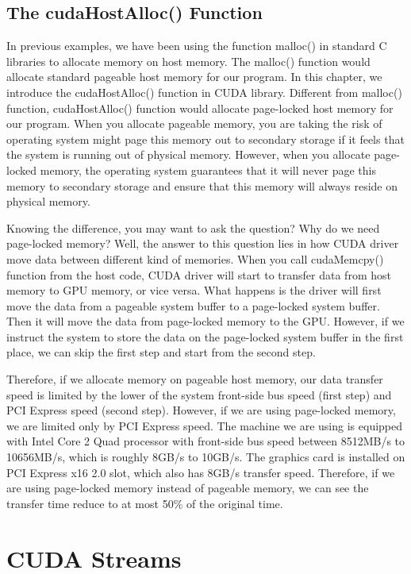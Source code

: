 \documentclass[letterpaper,10pt,openany,oneside]{sphinxmanual}
\begin{document}
\subsection{The cudaHostAlloc() Function}
\label{Streams/Streams:the-cudahostalloc-function}
In previous examples, we have been using the function malloc() in standard C libraries to allocate memory on host memory. The malloc() function would allocate standard pageable host memory for our program. In this chapter, we introduce the cudaHostAlloc() function in CUDA library. Different from malloc() function, cudaHostAlloc() function would allocate page-locked host memory for our program. When you allocate pageable memory, you are taking the risk of operating system might page this memory out to secondary storage if it feels that the system is running out of physical memory. However, when you allocate page-locked memory, the operating system guarantees that it will never page this memory to secondary storage and ensure that this memory will always reside on physical memory.

Knowing the difference, you may want to ask the question? Why do we need page-locked memory? Well, the answer to this question lies in how CUDA driver move data between different kind of memories. When you call cudaMemcpy() function from the host code, CUDA driver will start to transfer data from host memory to GPU memory, or vice versa. What happens is the driver will first move the data from a pageable system buffer to a page-locked system buffer. Then it will move the data from page-locked memory to the GPU. However, if we instruct the system to store the data on the page-locked system buffer in the first place, we can skip the first step and start from the second step.

Therefore, if we allocate memory on pageable host memory, our data transfer speed is limited by the lower of the system front-side bus speed (first step) and PCI Express speed (second step). However, if we are using page-locked memory, we are limited only by PCI Express speed. The machine we are using is equipped with Intel Core 2 Quad processor with front-side bus speed between 8512MB/s to 10656MB/s, which is roughly 8GB/s to 10GB/s. The graphics card is installed on PCI Express x16 2.0 slot, which also has 8GB/s transfer speed. Therefore, if we are using page-locked memory instead of pageable memory, we can see the transfer time reduce to at most 50\% of the original time.


\section{CUDA Streams}
\label{Streams/Streams:cuda-streams}


\renewcommand{\indexname}{Index}
\printindex
\end{document}
